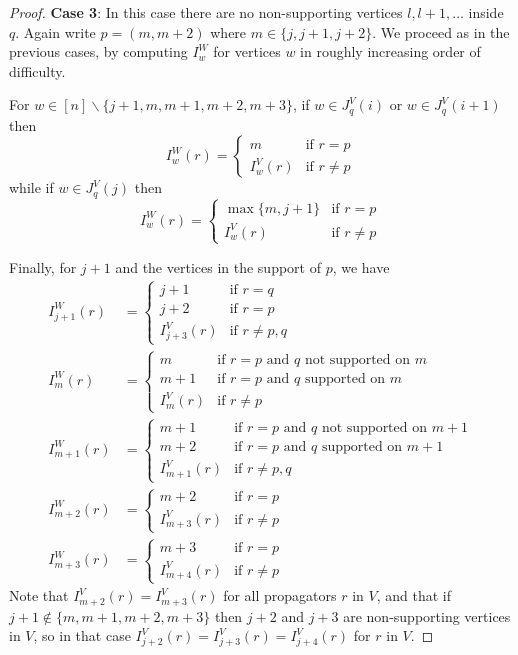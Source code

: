 \documentclass[11pt]{article}
\theoremstyle{remark}
\theoremstyle{definition}
\begin{document}
\begin{proof}
\textbf{Case 3}: In this case there are no non-supporting vertices $l, l+1, \ldots$ inside $q$.  Again write ${p=(m, m+2)}$ where $m\in \{j, j+1, j+2\}$. We proceed as in the previous cases, by computing $I^{W}_w$ for vertices $w$ in roughly increasing order of difficulty.

For $w \in [n]\backslash\{j+1,m,m+1,m+2,m+3\}$, if $w\in J_q^{V}(i)$ or $w\in J_q^{V}(i+1)$ then
    \[
    I_w^{W}(r) =  \begin{cases}
        m & \text{if } r=p \\
        I_{w}^{V}(r) & \text{if } r\neq p
      \end{cases} 
    \]
    while if $w\in J_q^{V}(j)$ then
    \[
    I_w^{W}(r) =  \begin{cases}
        \max\{m, j+1\} & \text{if } r=p \\
        I_{w}^{V}(r) & \text{if } r\neq p
      \end{cases} 
    \]

Finally, for $j+1$ and the vertices in the support of $p$, we have
\begin{align*}
  I_{j+1}^{W}(r) &= \begin{cases}
    j+1 & \text{if } r=q\\
    j+2 & \text{if } r=p\\
    I_{j+3}^{V}(r) & \text{if } r\neq p,q
  \end{cases}\\
  I_m^{W}(r) &= \begin{cases}
    m & \text{if $r=p$ and $q$ not supported on $m$}\\
    m+1 & \text{if $r=p$ and $q$ supported on $m$}\\
    I_{m}^{V}(r) & \text{if } r\neq p
  \end{cases}\\
  I_{m+1}^{W}(r) & = \begin{cases}
    m+1 & \text{if $r=p$ and $q$ not supported on $m+1$} \\
    m+2 & \text{if $r=p$ and $q$ supported on $m+1$} \\
    I_{m+1}^{V}(r) & \text{if } r\neq p,q
  \end{cases}\\
  I_{m+2}^{W}(r) & = \begin{cases}
    m+2 & \text{if } r=p \\
    I_{m+3}^{V}(r) & \text{if } r\neq p
  \end{cases}\\
  I_{m+3}^{W}(r) & = \begin{cases}
    m+3 & \text{if } r=p \\
    I_{m+4}^{V}(r) & \text{if } r\neq p
  \end{cases}
\end{align*}
Note that $I_{m+2}^{V}(r) = I_{m+3}^{V}(r)$ for all propagators $r$ in $V$, and that if $j+1\not\in\{m, m+1, m+2, m+3\}$ then $j+2$ and $j+3$ are non-supporting vertices in $V$, so in that case $I_{j+2}^{V}(r) = I_{j+3}^{V}(r) = I_{j+4}^{V}(r)$ for $r$ in $V$. 


\end{proof}
\end{document}
